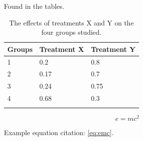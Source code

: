 \documentclass[fontsize=11pt, %
                             paper=a4, %
                             twoside, %
                             captions=tableheading,
                             index=totoc,
                             hyperref]{labbook}
\begin{document}
\begin{addmargin}[4cm]{0cm}

Found in the tables.
\begin{table}
\label{tab:treatments_xy}
\raggedleft
\begin{tabular}{l l l}
\toprule
\textbf{Groups} & \textbf{Treatment X} & \textbf{Treatment Y} \\
\toprule
1 & 0.2 & 0.8\\
2 & 0.17 & 0.7\\
3 & 0.24 & 0.75\\
4 & 0.68 & 0.3\\
\bottomrule\\
\end{tabular}
\caption{The effects of treatments X and Y on the four groups studied.}
\end{table}











  





\lipsum[10]

\begin{equation}
\label{eq:emc}
e = mc^2
\end{equation}

Example equation citation: \autoref{eq:emc}.



\lipsum[11-13]



\lipsum[14]



\lipsum[15]
 
 
\end{addmargin}
\end{document}

